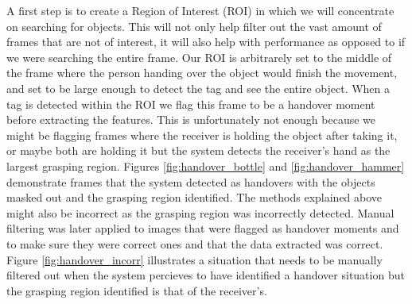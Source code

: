 A first step is to create a Region of Interest (ROI) in which we will concentrate on searching for objects. This will not only help filter out the vast amount of frames that are not of interest, it will also help with performance as opposed to if we were searching the entire frame. Our ROI is arbitrarely set to the middle of the frame where the person handing over the object would finish the movement, and set to be large enough to detect the tag and see the entire object. When a tag is detected within the ROI we flag this frame to be a handover moment before extracting the features. This is unfortunately not enough because we might be flagging frames where the receiver is holding the object after taking it, or maybe both are holding it but the system detects the receiver's hand as the largest grasping region. Figures \ref{fig:handover_bottle} and \ref{fig:handover_hammer} demonstrate frames that the system detected as handovers with the objects masked out and the grasping region identified. The methods explained above might also be incorrect as the grasping region was incorrectly detected. Manual filtering was later applied to images that were flagged as handover moments and to make sure they were correct ones and that the data extracted was correct. Figure \ref{fig:handover_incorr} illustrates a situation that needs to be manually filtered out when the system percieves to have identified a handover situation but the grasping region identified is that of the receiver's.

